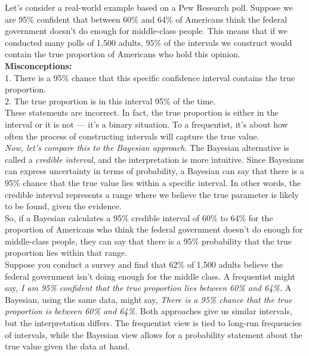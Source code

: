 Let’s consider a real-world example based on a Pew Research poll. Suppose we are 95\% confident that between 60\% and 64\% of Americans think the federal government doesn’t do enough for middle-class people. This means that if we conducted many polls of 1,500 adults, 95\% of the intervals we construct would contain the true proportion of Americans who hold this opinion.\\

\textbf{Misconceptions:}\\

1. There is a 95\% chance that this specific confidence interval contains the true proportion.\\
2. The true proportion is in this interval 95\% of the time.\\

These statements are incorrect. In fact, the true proportion is either in the interval or it is not — it’s a binary situation. To a frequentist, it’s about how often the process of constructing intervals will capture the true value.\\

\textit{Now, let's compare this to the Bayesian approach}. The Bayesian alternative is called a \textit{credible interval}, and the interpretation is more intuitive. Since Bayesians can express uncertainty in terms of probability, a Bayesian can say that there is a 95\% chance that the true value lies within a specific interval. In other words, the credible interval represents a range where we believe the true parameter is likely to be found, given the evidence.\\

So, if a Bayesian calculates a 95\% credible interval of 60\% to 64\% for the proportion of Americans who think the federal government doesn’t do enough for middle-class people, they can say that there is a 95\% probability that the true proportion lies within that range.\\

Suppose you conduct a survey and find that 62\% of 1,500 adults believe the federal government isn't doing enough for the middle class. A frequentist might say, \textit{I am 95\% confident that the true proportion lies between 60\% and 64\%.} A Bayesian, using the same data, might say, \textit{There is a 95\% chance that the true proportion is between 60\% and 64\%.} Both approaches give us similar intervals, but the interpretation differs. The frequentist view is tied to long-run frequencies of intervals, while the Bayesian view allows for a probability statement about the true value given the data at hand.

